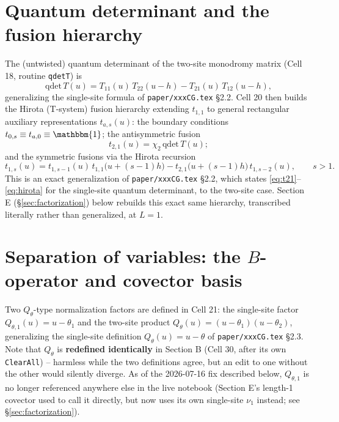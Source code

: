 \documentclass[11pt]{article}
\newcommand{\qth}{Q_\theta}
\newcommand{\qthone}{Q_{\theta,1}}
\begin{document}
\section{Quantum determinant and the fusion hierarchy}
\label{sec:fusion}

The (untwisted) quantum determinant of the two-site monodromy matrix (Cell 18, routine
\texttt{qdetT}) is
\begin{equation}
  \mathrm{qdet}\,T(u) = T_{11}(u)\,T_{22}(u-h) - T_{21}(u)\,T_{12}(u-h),
  \label{eq:qdet}
\end{equation}
generalizing the single-site formula of \texttt{paper/xxxCG.tex} \S2.2. Cell 20 then builds the
Hirota (T-system) fusion hierarchy extending $t_{1,1}$ to general rectangular auxiliary
representations $t_{a,s}(u)$: the boundary conditions $t_{0,s}\equiv t_{a,0}\equiv\mathbbm{1}$; the
antisymmetric fusion
\begin{equation}
  t_{2,1}(u) = \chi_2\,\mathrm{qdet}\,T(u);
  \label{eq:t21}
\end{equation}
and the symmetric fusions via the Hirota recursion
\begin{equation}
  t_{1,s}(u) = t_{1,s-1}(u)\,t_{1,1}\bigl(u+(s-1)h\bigr) - t_{2,1}\bigl(u+(s-1)h\bigr)\,t_{1,s-2}(u),
  \qquad s>1.
  \label{eq:hirota}
\end{equation}
This is an exact generalization of \texttt{paper/xxxCG.tex} \S2.2, which states
\eqref{eq:t21}--\eqref{eq:hirota} for the single-site quantum determinant, to the two-site case.
Section E (\S\ref{sec:factorization}) below rebuilds this exact same hierarchy, transcribed
literally rather than generalized, at $L=1$.

\section{Separation of variables: the \texorpdfstring{$B$}{B}-operator and covector basis}
\label{sec:sov}

Two $\qth$-type normalization factors are defined in Cell 21: the single-site factor
$\qthone(u)=u-\theta_1$ and the two-site product $\qth(u)=(u-\theta_1)(u-\theta_2)$, generalizing
the single-site definition $\qth(u)=u-\theta$ of \texttt{paper/xxxCG.tex} \S2.3. Note that $\qth$ is
\textbf{redefined identically} in Section B (Cell 30, after its own \texttt{ClearAll}) -- harmless
while the two definitions agree, but an edit to one without the other would silently diverge. As of
the 2026-07-16 fix described below, $\qthone$ is no longer referenced anywhere else in the live
notebook (Section E's length-1 covector used to call it directly, but now uses its own single-site
$\nu_1$ instead; see \S\ref{sec:factorization}).
\end{document}
